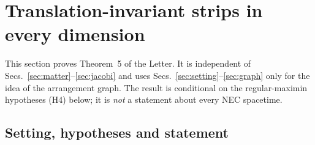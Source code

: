 \documentclass[aps,prd,onecolumn,superscriptaddress,nofootinbib,amsmath,amssymb,11pt]{revtex4-2}
\theoremstyle{definition}
\begin{document}
\section{Translation-invariant strips in every dimension}\label{sec:strips}

This section proves Theorem~5 of the Letter. It is independent of Secs.~\ref{sec:matter}--\ref{sec:jacobi} and uses
Secs.~\ref{sec:setting}--\ref{sec:graph} only for the idea of the arrangement graph. The result is conditional on the
regular-maximin hypotheses (H4) below; it is \emph{not} a statement about every NEC spacetime.

\subsection{Setting, hypotheses and statement}
\end{document}
